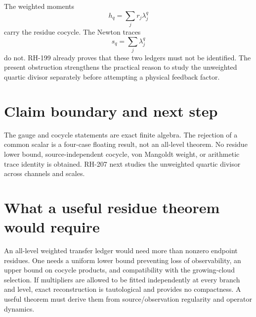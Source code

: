 \documentclass[12pt]{article}
\theoremstyle{remark}\newtheorem{remark}[theorem]{Remark}
\begin{document}
The weighted moments
\begin{equation}\label{eq:weighted}
 h_q=\sum_jr_j\lambda_j^q
\end{equation}
carry the residue cocycle.  The Newton traces
\begin{equation}\label{eq:unweighted}
 s_q=\sum_j\lambda_j^q
\end{equation}
do not.  RH-199 already proves that these two ledgers must not be identified.
The present obstruction strengthens the practical reason to study the
unweighted quartic divisor separately before attempting a physical feedback
factor.

\section{Claim boundary and next step}

The gauge and cocycle statements are exact finite algebra.  The rejection of
a common scalar is a four-case floating result, not an all-level theorem.
No residue lower bound, source-independent cocycle, von Mangoldt weight, or
arithmetic trace identity is obtained.  RH-207 next studies the unweighted
quartic divisor across channels and scales.

\section{What a useful residue theorem would require}

An all-level weighted transfer ledger would need more than nonzero endpoint
residues.  One needs a uniform lower bound preventing loss of observability,
an upper bound on cocycle products, and compatibility with the growing-cloud
selection.  If multipliers are allowed to be fitted independently at every
branch and level, exact reconstruction is tautological and provides no
compactness.  A useful theorem must derive them from source/observation
regularity and operator dynamics.


\end{document}
